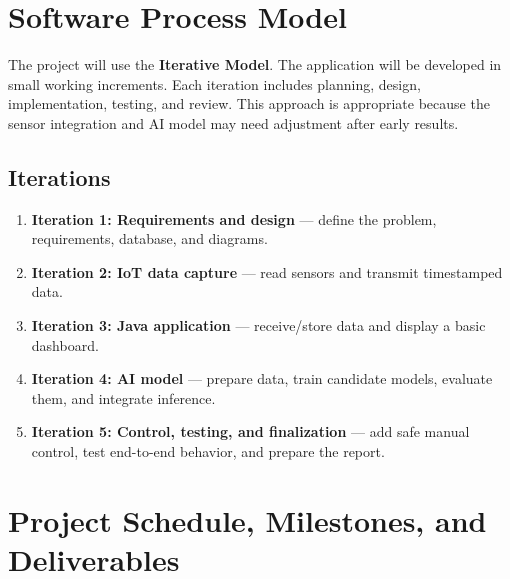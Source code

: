 \documentclass[12pt,a4paper]{report}
\begin{document}
\chapter{Software Process Model}
The project will use the \textbf{Iterative Model}. The application will be developed in small working increments. Each iteration includes planning, design, implementation, testing, and review. This approach is appropriate because the sensor integration and AI model may need adjustment after early results.

\section{Iterations}
\begin{enumerate}[leftmargin=*]
\item \textbf{Iteration 1: Requirements and design} --- define the problem, requirements, database, and diagrams.
\item \textbf{Iteration 2: IoT data capture} --- read sensors and transmit timestamped data.
\item \textbf{Iteration 3: Java application} --- receive/store data and display a basic dashboard.
\item \textbf{Iteration 4: AI model} --- prepare data, train candidate models, evaluate them, and integrate inference.
\item \textbf{Iteration 5: Control, testing, and finalization} --- add safe manual control, test end-to-end behavior, and prepare the report.
\end{enumerate}

\chapter{Project Schedule, Milestones, and Deliverables}
\end{document}
